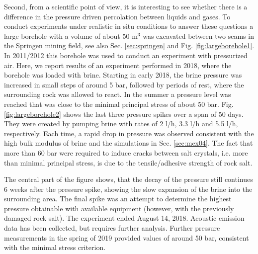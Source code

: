 Second, from a scientific point of view, it is interesting to see whether there is a difference in the pressure driven percolation between liquids and gases. To conduct experiments under realistic in situ conditions to answer these questions a large borehole with a volume of about 50 m$^3$ was excavated between two seams in the Springen mining field, see also Sec. \ref{sec:springen} and Fig. \ref{fig:largeborehole1}. In 2011/2012 this borehole was used to conduct an experiment with pressurized air. Here, we report results of an experiment performed in 2018, where the borehole was loaded with brine. Starting in early 2018, the brine pressure was increased in small steps of around 5 bar, followed by periods of rest, where the surrounding rock was allowed to react. In the summer a pressure level was reached that was close to the minimal principal stress of about 50 bar. Fig. \ref{fig:largeborehole2} shows the last three pressure spikes over a span of 50 days. They were created by pumping brine with rates of 2 l/h, 3.3 l/h and 5.5 l/h, respectively. Each time, a rapid drop in pressure was observed consistent with the high bulk modulus of brine and the simulations in Sec. \ref{sec:mex04}. The fact that more than 60 bar were required to induce cracks between salt crystals, i.e. more than minimal principal stress, is due to the tensile/adhesive strength of rock salt. 

The central part of the figure shows, that the decay of the pressure still continues 6 weeks after the pressure spike, showing the slow expansion of the brine into the surrounding area. The final spike was an attempt to determine the highest pressure obtainable with available equipment (however, with the previously damaged rock salt). The experiment ended August 14, 2018. Acoustic emission data has been collected, but requires further analysis. Further pressure measurements in the spring of 2019 provided values of around 50 bar, consistent with the minimal stress criterion. 

